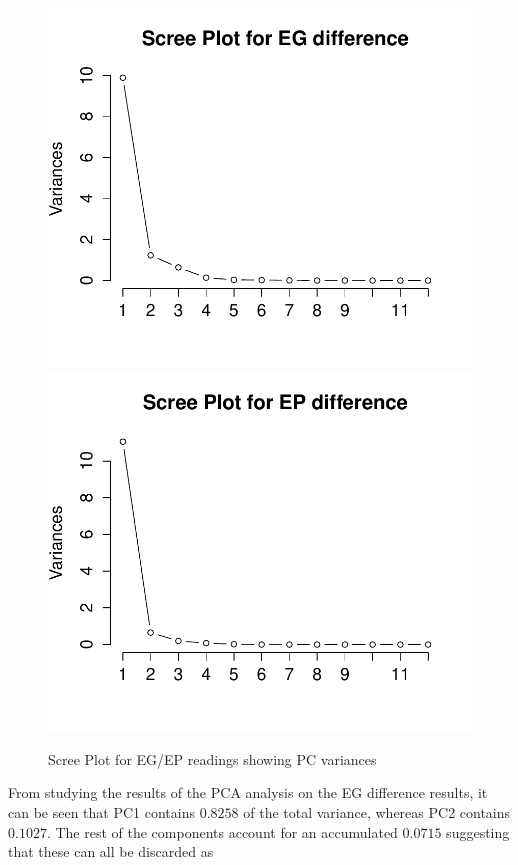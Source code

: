 \documentclass[twocolumn]{article}
\begin{document}
\begin{figure}[h!]
	\includegraphics[trim = 0mm 0mm 0mm 0mm, clip, scale=0.6]{EGScreePlot.pdf}
	\includegraphics[trim = 0mm 0mm 0mm 0mm, clip, scale=0.6]{EPScreePlot.pdf}
	\caption{Scree Plot for EG/EP readings showing PC variances}
	\label{fig:screeplot}
\end{figure}
From studying the results of the PCA analysis on the EG difference results, it can be seen that PC1 contains $0.8258$ of the total variance, 
whereas PC2 contains $0.1027$. The rest of the components account for an accumulated $0.0715$ suggesting that these can all be discarded as 
\end{document}
